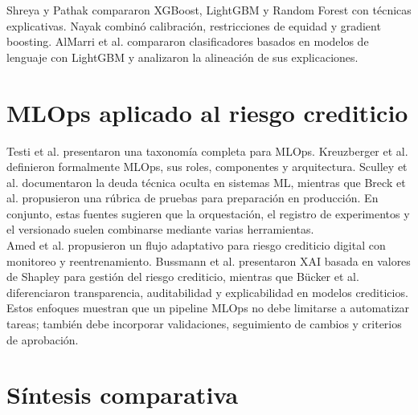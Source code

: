 Shreya y Pathak \cite{shreya2025explainable} compararon XGBoost, LightGBM y Random Forest con técnicas explicativas. Nayak \cite{nayak2026calibrated} combinó calibración, restricciones de equidad y gradient boosting. AlMarri et al. \cite{almarri2025interpreting} compararon clasificadores basados en modelos de lenguaje con LightGBM y analizaron la alineación de sus explicaciones.

\section{MLOps aplicado al riesgo crediticio}

Testi et al. \cite{testi2022mlops} presentaron una taxonomía completa para MLOps. Kreuzberger et al. \cite{kreuzberger2023machine} definieron formalmente MLOps, sus roles, componentes y arquitectura. Sculley et al. \cite{sculley2015hidden} documentaron la deuda técnica oculta en sistemas ML, mientras que Breck et al. \cite{breck2017ml} propusieron una rúbrica de pruebas para preparación en producción. En conjunto, estas fuentes sugieren que la orquestación, el registro de experimentos y el versionado suelen combinarse mediante varias herramientas.\\

Amed et al. \cite{amed2025pdx} propusieron un flujo adaptativo para riesgo crediticio digital con monitoreo y reentrenamiento. Bussmann et al. \cite{bussmann2021explainable} presentaron XAI basada en valores de Shapley para gestión del riesgo crediticio, mientras que Bücker et al. \cite{bucker2022transparency} diferenciaron transparencia, auditabilidad y explicabilidad en modelos crediticios. Estos enfoques muestran que un pipeline MLOps no debe limitarse a automatizar tareas; también debe incorporar validaciones, seguimiento de cambios y criterios de aprobación.

\section{Síntesis comparativa}

